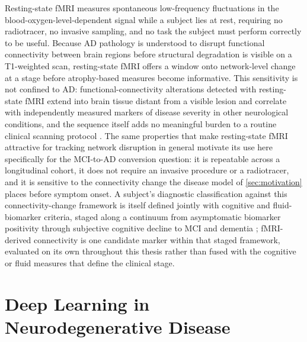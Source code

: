 Resting-state \ac{fMRI} measures spontaneous low-frequency fluctuations in the
blood-oxygen-level-dependent signal while a subject lies at rest, requiring no radiotracer,
no invasive sampling, and no task the subject must perform correctly to be useful. Because
\ac{AD} pathology is understood to disrupt functional connectivity between brain regions
before structural degradation is visible on a T1-weighted scan, resting-state \ac{fMRI}
offers a window onto network-level change at a stage before atrophy-based measures become
informative. This sensitivity is not confined to \ac{AD}: functional-connectivity
alterations detected with resting-state \ac{fMRI} extend into brain tissue distant from a
visible lesion and correlate with independently measured markers of disease severity in
other neurological conditions, and the sequence itself adds no meaningful burden to a
routine clinical scanning protocol \parencite{stoecklein2020glioma}. The same properties
that make resting-state \ac{fMRI} attractive for tracking network disruption in general
motivate its use here specifically for the \ac{MCI}-to-\ac{AD} conversion question:
it is repeatable across a longitudinal cohort, it does not require an invasive procedure or
a radiotracer, and it is sensitive to the connectivity change the disease model of
\autoref{sec:motivation} places before symptom onset. A subject's diagnostic classification
against this connectivity-change framework is itself defined jointly with cognitive and
fluid-biomarker criteria, staged along a continuum from asymptomatic biomarker positivity
through subjective cognitive decline to \ac{MCI} and dementia
\parencite{jessen2023scd}; \ac{fMRI}-derived connectivity is one candidate marker within
that staged framework, evaluated on its own throughout this thesis rather than fused with
the cognitive or fluid measures that define the clinical stage.

\section{Deep Learning in Neurodegenerative Disease}\label{sec:dl-neurodegeneration}

